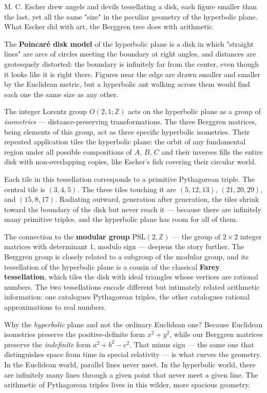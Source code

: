 M. C. Escher drew angels and devils tessellating a disk, each figure smaller than the last, yet all the same "size" in the peculiar geometry of the hyperbolic plane. What Escher did with art, the Berggren tree does with arithmetic.

The \textbf{Poincaré disk model} of the hyperbolic plane is a disk in which "straight lines" are arcs of circles meeting the boundary at right angles, and distances are grotesquely distorted: the boundary is infinitely far from the center, even though it looks like it is right there. Figures near the edge are drawn smaller and smaller by the Euclidean metric, but a hyperbolic ant walking across them would find each one the same size as any other.

The integer Lorentz group $O(2,1; \mathbb{Z})$ acts on the hyperbolic plane as a group of \textit{isometries} --- distance-preserving transformations. The three Berggren matrices, being elements of this group, act as three specific hyperbolic isometries. Their repeated application tiles the hyperbolic plane: the orbit of any fundamental region under all possible compositions of $A$, $B$, $C$ and their inverses fills the entire disk with non-overlapping copies, like Escher's fish covering their circular world.

Each tile in this tessellation corresponds to a primitive Pythagorean triple. The central tile is $(3, 4, 5)$. The three tiles touching it are $(5, 12, 13)$, $(21, 20, 29)$, and $(15, 8, 17)$. Radiating outward, generation after generation, the tiles shrink toward the boundary of the disk but never reach it --- because there are infinitely many primitive triples, and the hyperbolic plane has room for all of them.

The connection to the \textbf{modular group} $\text{PSL}(2, \mathbb{Z})$ --- the group of $2 \times 2$ integer matrices with determinant $1$, modulo sign --- deepens the story further. The Berggren group is closely related to a subgroup of the modular group, and its tessellation of the hyperbolic plane is a cousin of the classical \textbf{Farey tessellation}, which tiles the disk with ideal triangles whose vertices are rational numbers. The two tessellations encode different but intimately related arithmetic information: one catalogues Pythagorean triples, the other catalogues rational approximations to real numbers.

Why the \textit{hyperbolic} plane and not the ordinary Euclidean one? Because Euclidean isometries preserve the positive-definite form $x^2 + y^2$, while our Berggren matrices preserve the \textit{indefinite} form $a^2 + b^2 - c^2$. That minus sign --- the same one that distinguishes space from time in special relativity --- is what curves the geometry. In the Euclidean world, parallel lines never meet. In the hyperbolic world, there are infinitely many lines through a given point that never meet a given line. The arithmetic of Pythagorean triples lives in this wilder, more spacious geometry.

